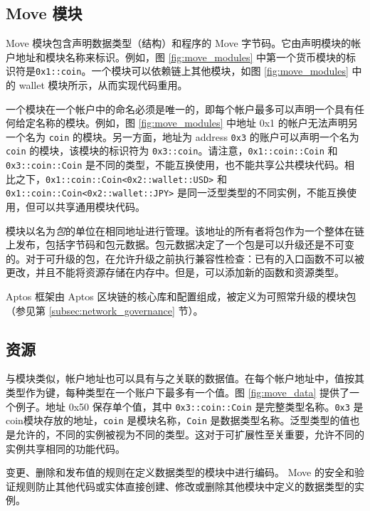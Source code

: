 \documentclass{article}
\begin{document}
\subsection{Move 模块}
Move 模块包含声明数据类型（结构）和程序的 Move 字节码。它由声明模块的帐户地址和模块名称来标识。例如，图 \ref{fig:move_modules} 中第一个货币模块的标识符是\texttt{0x1::coin}。一个模块可以依赖链上其他模块，如图 \ref{fig:move_modules} 中的 wallet 模块所示，从而实现代码重用。

一个模块在一个帐户中的命名必须是唯一的，即每个帐户最多可以声明一个具有任何给定名称的模块。例如，图 \ref{fig:move_modules}  中地址 0x1 的帐户无法声明另一个名为 \texttt{coin} 的模块。另一方面，地址为 address \texttt{0x3} 的账户可以声明一个名为 \texttt{coin} 的模块，该模块的标识符为 \texttt{0x3::coin}。请注意，\texttt{0x1::coin::Coin} 和 \texttt{0x3::coin::Coin} 是不同的类型，不能互换使用，也不能共享公共模块代码。相比之下，\texttt{0x1::coin::Coin<0x2::wallet::USD>} 和 \texttt{0x1::coin::Coin<0x2::wallet::JPY>} 是同一泛型类型的不同实例，不能互换使用，但可以共享通用模块代码。 

模块以名为\emph{包}的单位在相同地址进行管理。该地址的所有者将包作为一个整体在链上发布，包括字节码和包元数据。包元数据决定了一个包是可以升级还是不可变的。对于可升级的包，在允许升级之前执行兼容性检查：已有的入口函数不可以被更改，并且不能将资源存储在内存中。但是，可以添加新的函数和资源类型。 

Aptos 框架由 Aptos 区块链的核心库和配置组成，被定义为可照常升级的模块包（参见第 \ref{subsec:network_governance} 节）。

\subsection{资源}
\label{subsec:resources}

与模块类似，帐户地址也可以具有与之关联的数据值。在每个帐户地址中，值按其类型作为键，每种类型在一个账户下最多有一个值。图 \ref{fig:move_data} 提供了一个例子。地址 0x50 保存单个值，其中 \texttt{0x3::coin::Coin} 是完整类型名称。\texttt{0x3} 是coin模块存放的地址，\texttt{coin} 是模块名称，\texttt{Coin} 是数据类型名称。泛型类型的值也是允许的，不同的实例被视为不同的类型。这对于可扩展性至关重要，允许不同的实例共享相同的功能代码。 

变更、删除和发布值的规则在定义数据类型的模块中进行编码。 Move 的安全和验证规则防止其他代码或实体直接创建、修改或删除其他模块中定义的数据类型的实例。 
\end{document}
